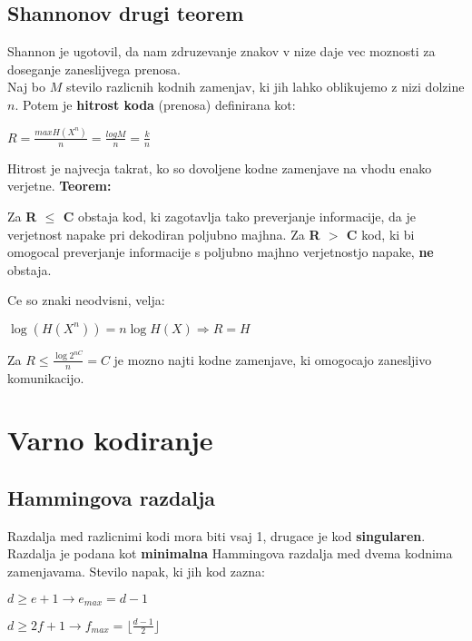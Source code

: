 \documentclass{article}
\begin{document}
\begin{multicols}{4}
\subsection{Shannonov drugi teorem}
Shannon je ugotovil, da nam zdruzevanje znakov v nize daje vec moznosti za doseganje zaneslijvega prenosa.\\
Naj bo $M$ stevilo razlicnih kodnih zamenjav, ki jih lahko oblikujemo z nizi dolzine $n$. Potem je \textbf{hitrost koda}
(prenosa)  definirana kot:
\begin{center}
    \begin{math}
        R = \frac{max H(X^n)}{n} = \frac{log M}{n} = \frac{k}{n}
    \end{math}
\end{center}
Hitrost je najvecja takrat, ko so dovoljene kodne zamenjave na vhodu enako verjetne.
\textbf{Teorem:}\\
\begin{center}
    Za \textbf{R $\leq$ C} obstaja kod, ki zagotavlja tako preverjanje informacije, da je verjetnost napake pri
    dekodiran  poljubno majhna. Za \textbf{R $>$ C} kod, ki bi omogocal preverjanje informacije s poljubno majhno
    verjetnostjo napake, \textbf{ne} obstaja.
\end{center}
Ce so znaki neodvisni, velja:
\begin{center}
    \begin{math}
        \log(H(X^n)) = n \log H(X) \Rightarrow R = H
    \end{math}
\end{center}
Za $R \leq \frac{\log 2^{nC}}{n} = C$ je mozno najti kodne zamenjave, ki omogocajo zanesljivo komunikacijo.

\section{Varno kodiranje}

\subsection{Hammingova razdalja}
Razdalja med razlicnimi kodi mora biti vsaj 1, drugace je kod \textbf{singularen}.
Razdalja je podana kot \textbf{minimalna} Hammingova razdalja med dvema kodnima zamenjavama.
Stevilo napak, ki jih kod zazna:
\begin{center}
    $d \geq e + 1 \rightarrow e_{max} = d-1$
\end{center}
\begin{center}
    $d \geq 2f + 1 \rightarrow f_{max} = \lfloor \frac{d-1}{2} \rfloor$
\end{center}


\end{multicols}
\end{document}
